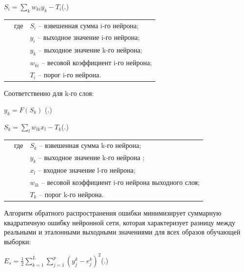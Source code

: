 {	\formulaspace \par \redline 
	$S_{i} = \sum \limits _{k}^{} w_{ki}y_{k} - T_{i}$\hfill (\thechaptercntr .\theformulacntr) \redline
	\formulaspace \addtocounter{formulacntr}{1}
	
	\begin{tabular}{p{}p{}p{}}
		& где  & $S_{i}$ {--} взвешенная сумма i-го нейрона; \\
		&      & $y_{i}$ {--} выходное значение i-го нейрона; \\
		&      & $y_{k}$ {--} выходное значение k-го нейрона; \\
		&      & $w_{ki}$ {--} весовой коэффициент i-го нейрона; \\
		&      & $T_{i}$ {--} порог i-го нейрона. \\
	\end{tabular}
	
    \par \redline 	Соответственно для k-го слоя:
	
	\formulaspace \par \redline 
	$y_{k} = F(S_{k}) $
	\hfill (\thechaptercntr .\theformulacntr) \redline
	\formulaspace \addtocounter{formulacntr}{1}
	
	\formulaspace \par \redline 
	$S_{k} = \sum \limits _{l}^{} w_{lk}x_{l} - T_{k}$\hfill (\thechaptercntr .\theformulacntr) \redline
	\formulaspace \addtocounter{formulacntr}{1}
	
	\begin{tabular}{p{}p{}p{}}
		& где  & $S_{k}$ {--} взвешенная сумма k-го нейрона; \\
		&      & $y_{k}$ {--} выходное значение k-го нейрона ; \\
		&      & $x_{l}$ {--} входное значение l-го нейрона; \\
		&      & $w_{lk}$ {--} весовой коэффициент i-го нейрона выходного слоя; \\
		&      & $T_{k}$ {--} порог k-го нейрона. \\
	\end{tabular}
	
	\par \redline Алгоритм обратного распространения ошибки минимизирует суммарную квадратичную ошибку нейронной сети, которая характеризует разницу между реальными и эталонными выходными значениями для всех образов обучающей выборки:
	
	\formulaspace \par \redline 
	$E_{s} = \frac{1}{2}\sum \limits _{k=1}^{L} \sum \limits _{j=1}^{p} (y_{j}^{k} - e_{j}^{k})^{2} $\hfill (\thechaptercntr .\theformulacntr) \redline
	\formulaspace \addtocounter{formulacntr}{1}
	
}
